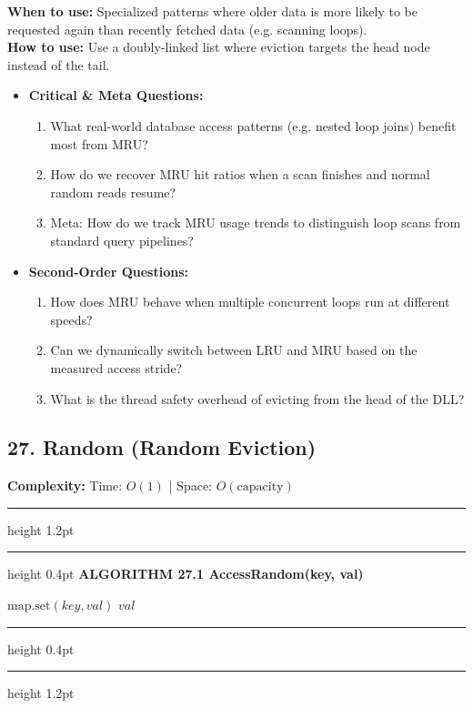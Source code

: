 \documentclass[11pt,a4paper]{article}
\newenvironment{textbookalgo}[2]{%
  \par\addvspace{1.2em}\noindent
  \hrule height 1.2pt
  \vspace{1.5pt}
  \hrule height 0.4pt
  \vspace{5pt}
  {\noindent\large\bfseries\sffamily ALGORITHM #1 \quad #2}
  \par\vspace{5pt}
  \RestyleAlgo{plain}
}{%
  \par\vspace{4pt}
  \hrule height 0.4pt
  \vspace{1.5pt}
  \hrule height 1.2pt
  \par\addvspace{1.2em}
}
\theoremstyle{definition}
\begin{document}
\noindent
\textbf{When to use:} Specialized patterns where older data is more likely to be requested again than recently fetched data (e.g. scanning loops).\\
\textbf{How to use:} Use a doubly-linked list where eviction targets the head node instead of the tail.
\begin{itemize}[leftmargin=*]
  \item[] \textbf{Critical \& Meta Questions:}
  \begin{enumerate}
    \item What real-world database access patterns (e.g. nested loop joins) benefit most from MRU?
    \item How do we recover MRU hit ratios when a scan finishes and normal random reads resume?
    \item Meta: How do we track MRU usage trends to distinguish loop scans from standard query pipelines?
  \end{enumerate}
  \item[] \textbf{Second-Order Questions:}
  \begin{enumerate}
    \item How does MRU behave when multiple concurrent loops run at different speeds?
    \item Can we dynamically switch between LRU and MRU based on the measured access stride?
    \item What is the thread safety overhead of evicting from the head of the DLL?
  \end{enumerate}
\end{itemize}
\medskip


\clearpage
\subsection{27. Random (Random Eviction)}

\noindent
\textbf{Complexity:} Time: $O(1)$ | Space: $O(\text{capacity})$
\smallskip

\begin{textbookalgo}{27.1}{AccessRandom(key, val)}
\begin{algorithm}[H]
$\text{map.set}(key, val)$\;
\Return $val$\;
\end{algorithm}
\end{textbookalgo}
\end{document}
